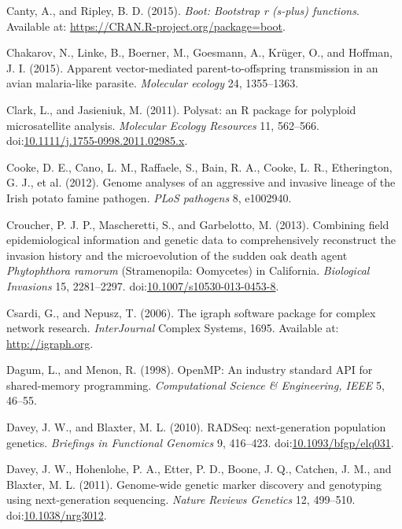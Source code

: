 \documentclass[double,12pt]{beavtex}
\begin{document}
  \hypertarget{ref-canty2015boot}{}
  Canty, A., and Ripley, B. D. (2015). \emph{Boot: Bootstrap r (s-plus)
  functions}. Available at: \url{https://CRAN.R-project.org/package=boot}.
  
  \hypertarget{ref-chakarov2015apparent}{}
  Chakarov, N., Linke, B., Boerner, M., Goesmann, A., Krüger, O., and
  Hoffman, J. I. (2015). Apparent vector-mediated parent-to-offspring
  transmission in an avian malaria-like parasite. \emph{Molecular ecology}
  24, 1355--1363.
  
  \hypertarget{ref-polysat}{}
  Clark, L., and Jasieniuk, M. (2011). Polysat: an R package for polyploid
  microsatellite analysis. \emph{Molecular Ecology Resources} 11,
  562--566.
  doi:\href{https://doi.org/10.1111/j.1755-0998.2011.02985.x}{10.1111/j.1755-0998.2011.02985.x}.
  
  \hypertarget{ref-cooke2012genome}{}
  Cooke, D. E., Cano, L. M., Raffaele, S., Bain, R. A., Cooke, L. R.,
  Etherington, G. J., et al. (2012). Genome analyses of an aggressive and
  invasive lineage of the Irish potato famine pathogen. \emph{PLoS
  pathogens} 8, e1002940.
  
  \hypertarget{ref-croucher2013combining}{}
  Croucher, P. J. P., Mascheretti, S., and Garbelotto, M. (2013).
  Combining field epidemiological information and genetic data to
  comprehensively reconstruct the invasion history and the microevolution
  of the sudden oak death agent \emph{Phytophthora ramorum} (Stramenopila:
  Oomycetes) in California. \emph{Biological Invasions} 15, 2281--2297.
  doi:\href{https://doi.org/10.1007/s10530-013-0453-8}{10.1007/s10530-013-0453-8}.
  
  \hypertarget{ref-csardi2006igraph}{}
  Csardi, G., and Nepusz, T. (2006). The igraph software package for
  complex network research. \emph{InterJournal} Complex Systems, 1695.
  Available at: \url{http://igraph.org}.
  
  \hypertarget{ref-dagum1998openmp}{}
  Dagum, L., and Menon, R. (1998). OpenMP: An industry standard API for
  shared-memory programming. \emph{Computational Science \& Engineering,
  IEEE} 5, 46--55.
  
  \hypertarget{ref-davey2010rad}{}
  Davey, J. W., and Blaxter, M. L. (2010). RADSeq: next-generation
  population genetics. \emph{Briefings in Functional Genomics} 9,
  416--423.
  doi:\href{https://doi.org/10.1093/bfgp/elq031}{10.1093/bfgp/elq031}.
  
  \hypertarget{ref-davey2011genome}{}
  Davey, J. W., Hohenlohe, P. A., Etter, P. D., Boone, J. Q., Catchen, J.
  M., and Blaxter, M. L. (2011). Genome-wide genetic marker discovery and
  genotyping using next-generation sequencing. \emph{Nature Reviews
  Genetics} 12, 499--510.
  doi:\href{https://doi.org/10.1038/nrg3012}{10.1038/nrg3012}.
  
\end{document}
